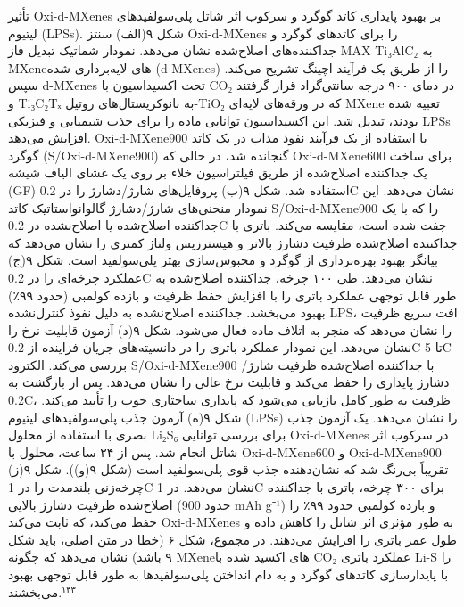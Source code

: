 \documentclass[12pt,a4paper,twocolumn]{article} %
\newcommand{\persian}[1]{\textfarsi{#1}}
\newcommand{\english}[1]{\textenglish{#1}}
\begin{document}
\persian{
تأثیر \english{Oxi-d-MXenes} بر بهبود پایداری کاتد گوگرد و سرکوب اثر شاتل پلی‌سولفیدهای لیتیوم (\english{LPSs}). شکل ۹(الف) سنتز \english{Oxi-d-MXenes} را برای کاتدهای گوگرد و جداکننده‌های اصلاح‌شده نشان می‌دهد. نمودار شماتیک تبدیل فاز \english{MAX} \english{Ti₃AlC₂} به \english{MXene}های لایه‌برداری شده (\english{d-MXenes}) را از طریق یک فرآیند اچینگ تشریح می‌کند. سپس \english{d-MXenes} تحت اکسیداسیون با \english{CO₂} در دمای ۹۰۰ درجه سانتی‌گراد قرار گرفتند و \english{Ti₃C₂Tₓ} به نانوکریستال‌های روتیل-\english{TiO₂} که در ورقه‌های لایه‌ای \english{MXene} تعبیه شده بودند، تبدیل شد. این اکسیداسیون توانایی ماده را برای جذب شیمیایی و فیزیکی \english{LPSs} افزایش می‌دهد. \english{Oxi-d-MXene900} با استفاده از یک فرآیند نفوذ مذاب در یک کاتد گوگرد (\english{S/Oxi-d-MXene900}) گنجانده شد، در حالی که \english{Oxi-d-MXene600} برای ساخت یک جداکننده اصلاح‌شده از طریق فیلتراسیون خلاء بر روی یک غشای الیاف شیشه (\english{GF}) استفاده شد. شکل ۹(ب) پروفایل‌های شارژ/دشارژ را در \english{0.2C} نشان می‌دهد. این نمودار منحنی‌های شارژ/دشارژ گالوانواستاتیک کاتد \english{S/Oxi-d-MXene900} را که با یک جداکننده اصلاح‌شده یا اصلاح‌نشده در \english{0.2C} جفت شده است، مقایسه می‌کند. باتری با جداکننده اصلاح‌شده ظرفیت دشارژ بالاتر و هیسترزیس ولتاژ کمتری را نشان می‌دهد که بیانگر بهبود بهره‌برداری از گوگرد و محبوس‌سازی بهتر پلی‌سولفید است. شکل ۹(ج) عملکرد چرخه‌ای را در \english{0.2C} نشان می‌دهد. طی ۱۰۰ چرخه، جداکننده اصلاح‌شده به طور قابل توجهی عملکرد باتری را با افزایش حفظ ظرفیت و بازده کولمبی (حدود ۹۹٪) بهبود می‌بخشد. جداکننده اصلاح‌نشده به دلیل نفوذ کنترل‌نشده \english{LPS}، افت سریع ظرفیت را نشان می‌دهد که منجر به اتلاف ماده فعال می‌شود. شکل ۹(د) آزمون قابلیت نرخ را نشان می‌دهد. این نمودار عملکرد باتری را در دانسیته‌های جریان فزاینده از \english{0.2C} تا \english{5C} بررسی می‌کند. الکترود \english{S/Oxi-d-MXene900} با جداکننده اصلاح‌شده ظرفیت شارژ/دشارژ پایداری را حفظ می‌کند و قابلیت نرخ عالی را نشان می‌دهد. پس از بازگشت به \english{0.2C}، ظرفیت به طور کامل بازیابی می‌شود که پایداری ساختاری خوب را تأیید می‌کند. شکل ۹(ه) آزمون جذب پلی‌سولفیدهای لیتیوم (\english{LPSs}) را نشان می‌دهد. یک آزمون جذب بصری با استفاده از محلول \english{Li₂S₆} برای بررسی توانایی \english{Oxi-d-MXenes} در سرکوب اثر شاتل انجام شد. پس از ۲۴ ساعت، محلول با \english{Oxi-d-MXene600} و \english{Oxi-d-MXene900} تقریباً بی‌رنگ شد که نشان‌دهنده جذب قوی پلی‌سولفید است (شکل ۹(و)). شکل ۹(ز) چرخه‌زنی بلندمدت را در \english{1C} نشان می‌دهد. در \english{1C} برای ۳۰۰ چرخه، باتری با جداکننده اصلاح‌شده ظرفیت دشارژ بالایی (حدود \english{900 mAh g⁻¹}) و بازده کولمبی حدود ۹۹٪ را حفظ می‌کند، که ثابت می‌کند \english{Oxi-d-MXenes} به طور مؤثری اثر شاتل را کاهش داده و طول عمر باتری را افزایش می‌دهند. در مجموع، شکل ۶ (خطا در متن اصلی، باید شکل ۹ باشد) نشان می‌دهد که چگونه \english{MXene}های اکسید شده با \english{CO₂} عملکرد باتری \english{Li-S} را با پایدارسازی کاتدهای گوگرد و به دام انداختن پلی‌سولفیدها به طور قابل توجهی بهبود می‌بخشند.$^{۱۴۳}$
}
\end{document}
